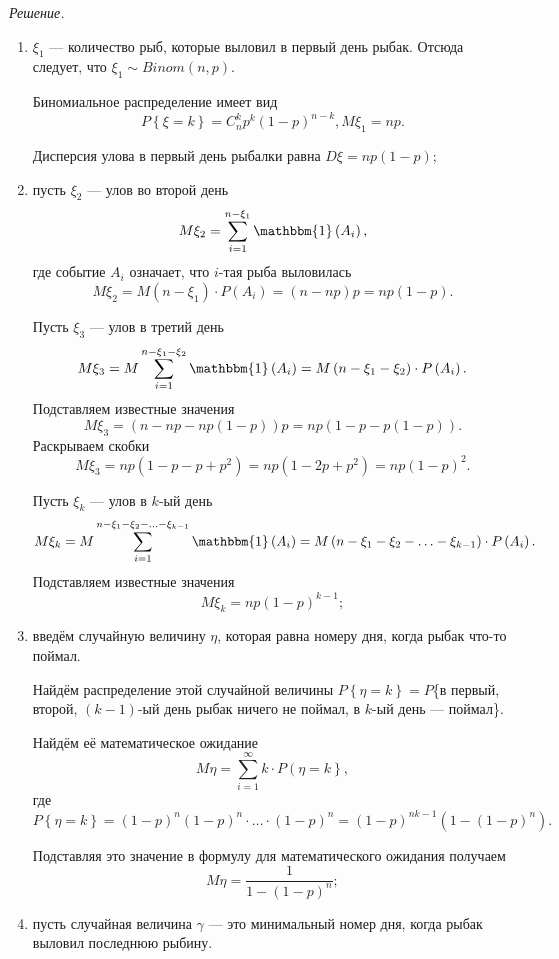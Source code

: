 \textit{Решение.}
\begin{enumerate}[label=\alph*)]
\item $ \xi_1$ --- количество рыб, которые выловил в первый день рыбак.
Отсюда следует, что $ \xi_1 \sim Binom \left( n, p \right) $.

Биномиальное распределение имеет вид
$$P \left\{ \xi = k \right\} = C_n^k p^k \left( 1-p \right)^{n-k},
M \xi_1 = np.$$

Дисперсия улова в первый день рыбалки равна $D \xi = np \left( 1-p \right) $;
\item пусть $ \xi_2$ --- улов во второй день
$$M \xi_2 =
\sum \limits_{i=1}^{n - \xi_1} \mathbbm{1} \left( A_i \right),$$
где событие $A_i$ означает, что $i$-тая рыба выловилась
$$M \xi_2 = M \left( n - \xi_1 \right) \cdot P \left( A_i \right) =
\left( n - np \right) p =
np \left( 1 - p \right).$$

Пусть $ \xi_3$ --- улов в третий день
$$M \xi_3 =
M \sum \limits_{i=1}^{n - \xi_1 - \xi_2} \mathbbm{1} \left( A_i \right) =
M \left( n - \xi_1 - \xi_2 \right) \cdot P \left( A_i \right).$$
Подставляем известные значения
$$M \xi_3 =
\left( n - np - np \left( 1-p \right) \right) p =
np \left( 1 - p - p \left( 1-p \right) \right).$$
Раскрываем скобки
$$M \xi_3 =
np \left( 1 - p - p + p^2 \right) =
np \left( 1-2p+p^2 \right) =
np \left( 1-p \right)^2.$$

Пусть $ \xi_k$ --- улов в $k$-ый день
$$M \xi_k =
M \sum \limits_{i=1}^{n - \xi_1 - \xi_2 - \dotsc - \xi_{k-1}} \mathbbm{1} \left( A_i \right) =
M \left( n - \xi_1 - \xi_2 - \dotsc - \xi_{k-1} \right) \cdot P \left( A_i \right).$$
Подставляем известные значения
$$M \xi_k =
np \left( 1-p \right)^{k-1};$$
\item введём случайную величину $ \eta $, которая равна номеру дня, когда рыбак что-то поймал.

Найдём распределение этой случайной величины
$P \left\{ \eta = k \right\} = P$\{в первый, второй, $ \left( k-1 \right) $-ый день рыбак ничего не поймал, в $k$-ый день --- поймал\}.

Найдём её математическое ожидание
$$M \eta =
\sum \limits_{i=1}^{ \infty } k \cdot P \left( \eta = k \right\},$$
где
$$P \left\{ \eta = k \right\} =
\left( 1-p \right)^n \left( 1-p \right)^n \cdot \dotsc \cdot \left( 1-p \right)^n =
\left( 1-p \right)^{nk-1} \left( 1 - \left( 1-p \right)^n \right).$$

Подставляя это значение в формулу для математического ожидания получаем
$$M \eta =
\frac{1}{1 - \left( 1-p \right)^n};$$
\item пусть случайная величина $ \gamma $ --- это минимальный номер дня, когда рыбак выловил последнюю рыбину.


\end{enumerate}
